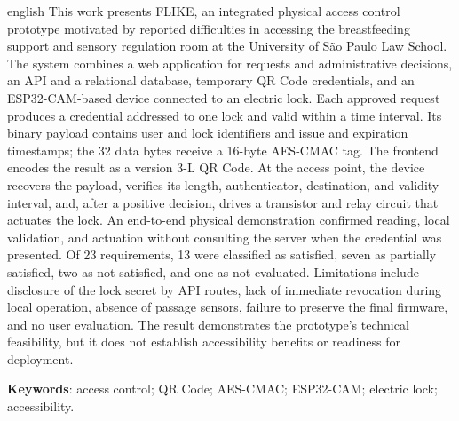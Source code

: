 \documentclass[
	12pt,				%
	openright,			%
	twoside,			%
	a4paper,			%
	english,			%
	french,				%
	spanish,			%
	brazil				%
	]{abntex2}
\begin{document}
\begin{resumo}[Abstract]
 \begin{otherlanguage*}{english}
This work presents FLIKE, an integrated physical access control prototype motivated by reported difficulties in accessing the breastfeeding support and sensory regulation room at the University of São Paulo Law School. The system combines a web application for requests and administrative decisions, an API and a relational database, temporary QR Code credentials, and an ESP32-CAM-based device connected to an electric lock. Each approved request produces a credential addressed to one lock and valid within a time interval. Its binary payload contains user and lock identifiers and issue and expiration timestamps; the 32 data bytes receive a 16-byte AES-CMAC tag. The frontend encodes the result as a version 3-L QR Code. At the access point, the device recovers the payload, verifies its length, authenticator, destination, and validity interval, and, after a positive decision, drives a transistor and relay circuit that actuates the lock. An end-to-end physical demonstration confirmed reading, local validation, and actuation without consulting the server when the credential was presented. Of 23 requirements, 13 were classified as satisfied, seven as partially satisfied, two as not satisfied, and one as not evaluated. Limitations include disclosure of the lock secret by API routes, lack of immediate revocation during local operation, absence of passage sensors, failure to preserve the final firmware, and no user evaluation. The result demonstrates the prototype's technical feasibility, but it does not establish accessibility benefits or readiness for deployment.
   \vspace{\onelineskip}
 
   \noindent 
   \textbf{Keywords}: access control; QR Code; AES-CMAC; ESP32-CAM; electric lock; accessibility.
 \end{otherlanguage*}
\end{resumo}

 

  
\end{document}
